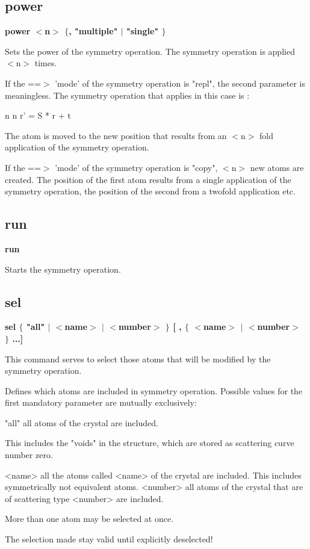 \subsection*{power}
{\bf power $ <$n$> $ $ \{$, "multiple" $| $ "single" $\} $ \par }
\par
\vspace{3pt}
Sets the power of the symmetry operation. The symmetry operation is 
applied $ <$n$> $ times. 
\par
If the ==$> $ 'mode' of the symmetry operation is "repl", the second 
parameter is meaningless. The symmetry operation that applies in 
this case is : 
\par
\begin{MacVerbatim}
       n         n
 r' = S  * r  + t
\end{MacVerbatim}
The atom is moved to the new position that results from an $ <$n$> $ fold 
application of the symmetry operation. 
\par
If the ==$> $ 'mode' of the symmetry operation is "copy", $ <$n$> $ new atoms 
are created. The position of the first atom results from a single 
application of the symmetry operation, the position of the second from 
a twofold application etc. 
\subsection*{run}
{\bf run \par }
\par
\vspace{3pt}
Starts the symmetry operation. 
\subsection*{sel}
{\bf sel $ \{$ "all" $| $ $ <$name$> $ $| $ $ <$number$> $ $\} $ [ , $ \{$ $ <$name$> $ $| $ $ <$number$> $ $\} $ ...] \par }
\par
\vspace{3pt}
This command serves to select 
those atoms that will be modified by the symmetry operation. 
\par
Defines which atoms are included in symmetry operation. Possible values 
for the first mandatory parameter are mutually exclusively: 
\par
\begin{MacVerbatim}
"all"     all atoms of the crystal are included.
\end{MacVerbatim}
          This includes the "voids" in the structure, which are stored 
          as scattering curve number zero. 
\begin{MacVerbatim}
<name>    all the atoms called <name> of the crystal are included.
          This includes symmetrically not equivalent atoms.
<number>  all atoms of the crystal that are of scattering type <number>
          are included.
\end{MacVerbatim}
More than one atom may be selected at once. 
\par
The selection made stay valid until explicitly deselected! 
